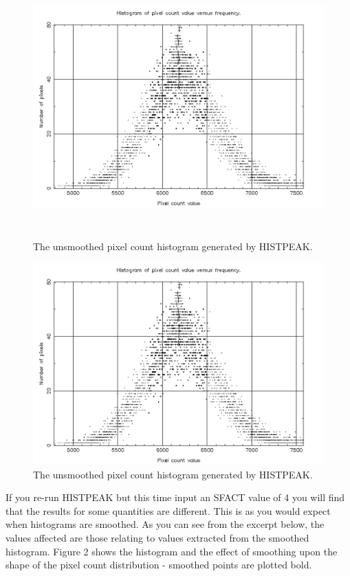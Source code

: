 \documentclass[twoside,11pt]{article}
\newenvironment{latexonly}{}{}
\begin{document}
\begin{latexonly}
\begin{figure}[htlb]
\centering
\includegraphics[width=151mm,height=100mm]{sun180_diag1}
\caption{The unsmoothed pixel count histogram generated by HISTPEAK.}
\end{figure}
\end{latexonly}
\begin{htmlonly}
\begin{figure}[htlb]
\centering
\includegraphics{sun180_diag1}
\caption{The unsmoothed pixel count histogram generated by HISTPEAK.}
\end{figure}
\end{htmlonly}

If you re-run HISTPEAK but this time input an SFACT value of 4 you will find
that the results for some quantities are different. This is as you would
expect when histograms are smoothed. As you can see from the excerpt below,
the values affected are those relating to values extracted from the
smoothed histogram. Figure 2 shows the histogram and the effect
of smoothing upon the shape of the pixel count distribution - smoothed
points are plotted bold.
\end{document}
